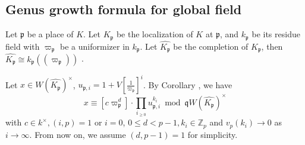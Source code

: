 \documentclass{proc-l}
\theoremstyle{definition}
\theoremstyle{remark}
\numberwithin{equation}{section}
\begin{document}
\subsection{Genus growth formula for global field}\label{s5.1}
Let $\mathfrak p$ be a place of $K$. Let $K_\mathfrak p$ be the localization of $K$ at $\mathfrak p$, and $k_\mathfrak p$ be its residue field with $\varpi_{\mathfrak p}$ be a uniformizer in $k_{\mathfrak p}$. Let $\widehat{K_\mathfrak p}$ be the completion of $K_\mathfrak p$, then $\widehat{K_\mathfrak p}\cong k_\mathfrak p(\!(\varpi_\mathfrak p)\!)$ \cite[Theorem 15]{5953cc44-5a9f-317f-90f3-83c005ff4b88}. 

Let $x\in W(\widehat{K_\mathfrak p})^\times$, $u_{\mathfrak p,i}=1+V[\frac{1}{\varpi_\mathfrak p}]^i$. By Corollary \boxed{\ref{3.8}}, we have 
$$x\equiv [c\varpi_\mathfrak p^d]\cdot\prod_{i_{\geq0}}u_{\mathfrak p,i}^{k_i}\bmod\mathfrak qW(\widehat{K_\mathfrak p})^\times$$
with $c\in k^\times,(i,p)=1$ or $i=0$, $0\leq d<p-1,k_i\in \mathbb Z_p$ and $v_p(k_i)\rightarrow 0$ as $i\rightarrow \infty$. From now on, we assume $(d,p-1)=1$ for simplicity. %
\end{document}
